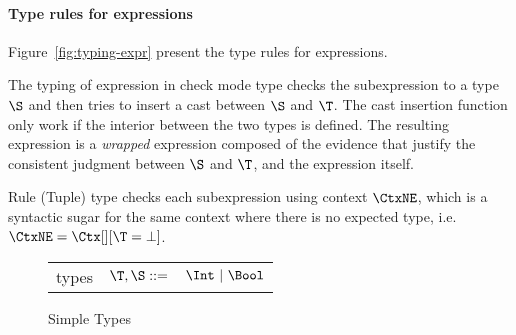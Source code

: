 \documentclass[acmsmall,anonymous,review,screen,nonacm]{acmart}
\begin{document}
\paragraph{Type rules for expressions}
Figure~\ref{fig:typing-expr} present the type rules for expressions.

The typing of expression in check mode type checks the subexpression to a type $\S$ and then tries to insert a cast between $\S$ and $\T$.
The cast insertion function only work if the interior between the two types is defined. The resulting expression is a \emph{wrapped} expression composed of the evidence that justify the consistent judgment between $\S$ and $\T$, and the expression itself.

Rule (Tuple) type checks each subexpression using context $\CtxNE$, which is a syntactic sugar for the same context where there is no expected type, i.e. $\CtxNE = \Ctx[][\T = \bot]$.
\begin{figure}[t]
\begin{small}
\begin{tabular}{r >{$}r<{$} >{$}l<{$}}
	types & \T,\S ::= & \Int ~|~ \Bool
\end{tabular}
\end{small}	
\caption{Simple Types}
\end{figure}
\end{document}
